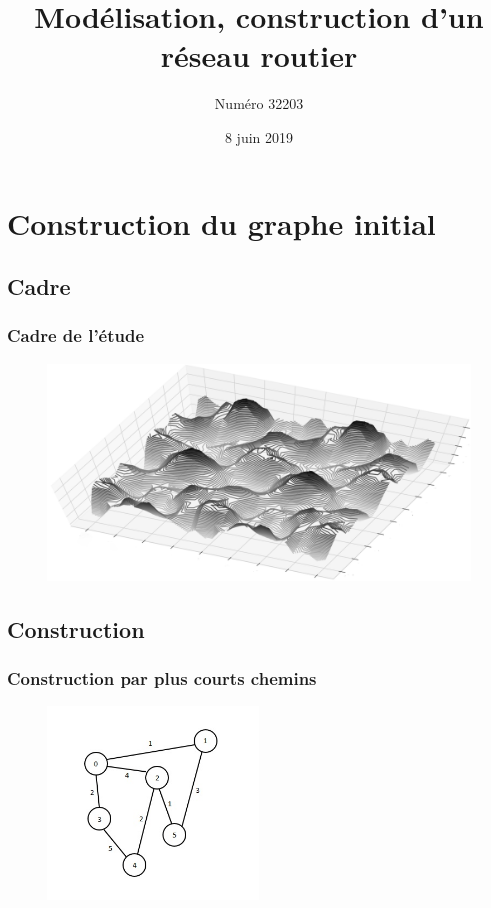 \documentclass{beamer}[11pt]
\title[Construction d'un réseau routier \hspace{2.5cm}\insertframenumber/\inserttotalframenumber]{Modélisation, construction d'un réseau routier}
\author{Numéro 32203}
\date{8 juin 2019}
\begin{document}
  \begin{frame}
    \titlepage
  \end{frame}

  \begin{frame}
    \tableofcontents
  \end{frame}

	\section{Construction du graphe initial}

		\subsection{Cadre}

			\begin{frame}
				\frametitle{Cadre de l'étude}
				\begin{figure}[t]
					\centering
						\includegraphics[width=1\textwidth]{Pics/img1.png}
				\end{figure}
			\end{frame}

		\subsection{Construction}

			\begin{frame}
				\frametitle{Construction par plus courts chemins}
				\begin{figure}[t]
					\centering
						\includegraphics[width=0.5\textwidth]{Pics/grph.jpg}
				\end{figure}
			\end{frame}
\end{document}
